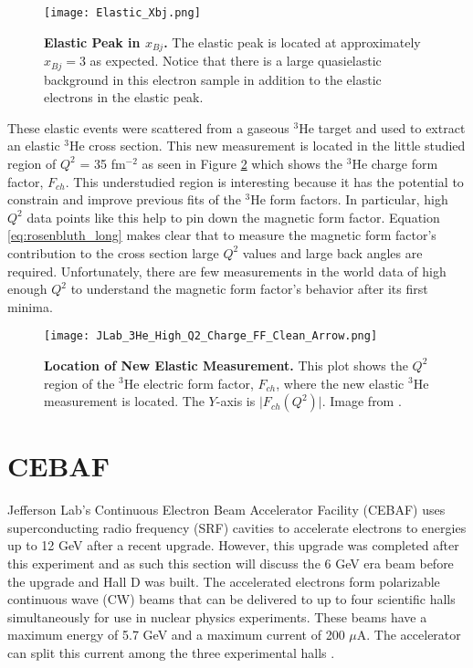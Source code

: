 \begin{figure}[!ht]
\begin{center}
\texttt{[image: Elastic\_Xbj.png]}
\end{center}
\caption[Elastic Peak in $x_{Bj}$]{
{\bf{Elastic Peak in $x_{Bj}$.}} The elastic peak is located at approximately $x_{Bj}=3$ as expected. Notice that there is a large quasielastic background in this electron sample in addition to the elastic electrons in the elastic peak.}
\label{fig:elastic_xbj}
\end{figure}

These elastic events were scattered from a gaseous $^3$He target and used to extract an elastic $^3$He cross section. This new measurement is located in the little studied region of $Q^2$ = 35 fm$^{-2}$ as seen in Figure \ref{fig:jlab_3he} which shows the $^3$He charge form factor, $F_{ch}$. This understudied region is interesting because it has the potential to constrain and improve previous fits of the $^3$He form factors. In particular, high $Q^2$ data points like this help to pin down the magnetic form factor. Equation \ref{eq:rosenbluth_long} makes clear that to measure the magnetic form factor's contribution to the cross section large $Q^2$ values and large back angles are required. Unfortunately, there are few measurements in the world data of high enough $Q^2$ to understand the magnetic form factor's behavior after its first minima. 

\begin{figure}[!ht]
\begin{center}
\texttt{[image: JLab\_3He\_High\_Q2\_Charge\_FF\_Clean\_Arrow.png]}
\end{center}
\caption[Location of New Elastic Measurement]{
{\bf{Location of New Elastic Measurement.}} This plot shows the $Q^2$ region of the $^3$He electric form factor, $F_{ch}$, where the new elastic $^3$He measurement is located. The $Y$-axis is $\lvert {F_{ch}(Q^2)} \rvert$. Image from \cite{Article:Alex}.}
\label{fig:jlab_3he}
\end{figure}

\section{CEBAF}
\label{sec:CEBAF}

Jefferson Lab's Continuous Electron Beam Accelerator Facility (CEBAF) uses superconducting radio frequency (SRF) cavities to accelerate electrons to energies up to 12 GeV after a recent upgrade. However, this upgrade was completed after this experiment and as such this section will discuss the 6 GeV era beam before the upgrade and Hall D was built. The accelerated electrons form polarizable continuous wave (CW) beams that can be delivered to up to four scientific halls simultaneously for use in nuclear physics experiments. These beams have a maximum energy of 5.7 GeV and a maximum current of 200 $\mu$A. The accelerator can split this current among the three experimental halls \cite{Article:CEBAF}.

